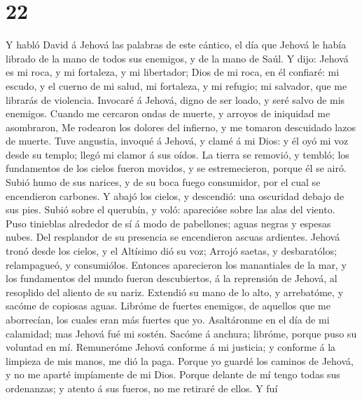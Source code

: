 \hypertarget{section-21}{%
\section{22}\label{section-21}}

 Y habló David á Jehová las palabras de este cántico, el día
que Jehová le había librado de la mano de todos sus enemigos, y de la
mano de Saúl.  Y dijo: Jehová es mi roca, y mi fortaleza, y
mi libertador;  Dios de mi roca, en él confiaré: mi escudo,
y el cuerno de mi salud, mi fortaleza, y mi refugio; mi salvador, que me
librarás de violencia.  Invocaré á Jehová, digno de ser
loado, y seré salvo de mis enemigos.  Cuando me cercaron
ondas de muerte, y arroyos de iniquidad me asombraron,  Me
rodearon los dolores del infierno, y me tomaron descuidado lazos de
muerte.  Tuve angustia, invoqué á Jehová, y clamé á mi Dios:
y él oyó mi voz desde su templo; llegó mi clamor á sus oídos.
 La tierra se removió, y tembló; los fundamentos de los
cielos fueron movidos, y se estremecieron, porque él se airó.
 Subió humo de sus narices, y de su boca fuego consumidor,
por el cual se encendieron carbones.  Y abajó los cielos, y
descendió: una oscuridad debajo de sus pies.  Subió sobre
el querubín, y voló: aparecióse sobre las alas del viento. 
Puso tinieblas alrededor de sí á modo de pabellones; aguas negras y
espesas nubes.  Del resplandor de su presencia se
encendieron ascuas ardientes.  Jehová tronó desde los
cielos, y el Altísimo dió su voz;  Arrojó saetas, y
desbaratólos; relampagueó, y consumiólos.  Entonces
aparecieron los manantiales de la mar, y los fundamentos del mundo
fueron descubiertos, á la reprensión de Jehová, al resoplido del aliento
de su nariz.  Extendió su mano de lo alto, y arrebatóme, y
sacóme de copiosas aguas.  Libróme de fuertes enemigos, de
aquellos que me aborrecían, los cuales eran más fuertes que yo.
 Asaltáronme en el día de mi calamidad; mas Jehová fué mi
sostén.  Sacóme á anchura; libróme, porque puso su voluntad
en mí.  Remuneróme Jehová conforme á mi justicia; y
conforme á la limpieza de mis manos, me dió la paga. 
Porque yo guardé los caminos de Jehová, y no me aparté impíamente de mi
Dios.  Porque delante de mí tengo todas sus ordenanzas; y
atento á sus fueros, no me retiraré de ellos.  Y fuí
